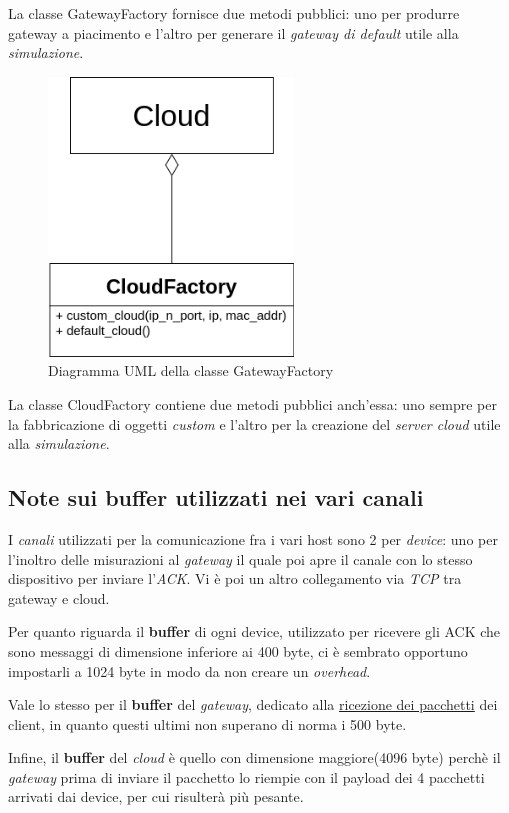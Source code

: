 \documentclass[a4paper,12pt]{report}
\begin{document}
La classe GatewayFactory fornisce due metodi pubblici: uno per produrre gateway a piacimento e l'altro per generare il \emph{gateway di default} utile alla \emph{simulazione}.

\begin{figure}[H]
    \centering{}
    \includegraphics[width=.4\textwidth,height=20em]{img/UML_CloudFactory.png}
    \caption{Diagramma UML della classe GatewayFactory}
    \label{img:uml_cloudfactory}
\end{figure}

La classe CloudFactory contiene due metodi pubblici anch'essa: uno sempre per la fabbricazione di oggetti \emph{custom} e l'altro per la creazione del \emph{server cloud} utile alla \emph{simulazione}.

\subsection{Note sui buffer utilizzati nei vari canali}
I \emph{canali} utilizzati per la comunicazione fra i vari host sono 2 per \emph{device}: uno per l'inoltro delle misurazioni al \emph{gateway} il quale poi apre il canale con lo stesso dispositivo per inviare l'\emph{ACK}.
%
Vi è poi un altro collegamento via \emph{TCP} tra gateway e cloud.

Per quanto riguarda il \textbf{buffer} di ogni device, utilizzato per ricevere gli ACK che sono messaggi di dimensione inferiore ai 400 byte, ci è sembrato opportuno impostarli a 1024 byte in modo da non creare un \emph{overhead}.

Vale lo stesso per il \textbf{buffer} del \emph{gateway}, dedicato alla \underline{ricezione dei pacchetti} dei client, in quanto questi ultimi non superano di norma i 500 byte.

Infine, il \textbf{buffer} del \emph{cloud} è quello con dimensione maggiore(4096 byte) perchè il \emph{gateway} prima di inviare il pacchetto lo riempie con il payload dei 4 pacchetti arrivati dai device, per cui risulterà più pesante.
\end{document}
